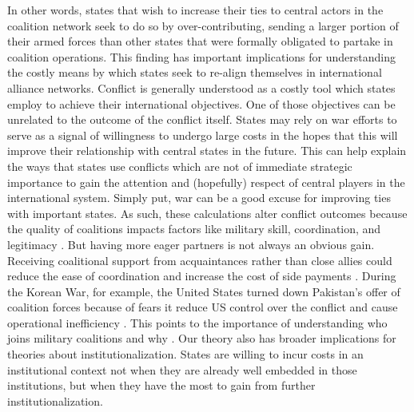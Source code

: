\documentclass[12pt,letterpaper]{article}
\begin{document}
	In other words, states that wish to increase their ties to central actors in the coalition network seek to do so by over-contributing, sending a larger portion of their armed forces than other states that were formally obligated to partake in coalition operations. This finding has important implications for understanding the costly means by which states seek to re-align themselves in international alliance networks. Conflict is generally understood as a costly tool which states employ to achieve their international objectives. One of those objectives can be unrelated to the outcome of the conflict itself. States may rely on war efforts to serve as a signal of willingness to undergo large costs in the hopes that this will improve their relationship with central states in the future. This can help explain the ways that states use conflicts which are not of immediate strategic importance to gain the attention and (hopefully) respect of central players in the international system. Simply put, war can be a good excuse for improving ties with important states. As such, these calculations alter conflict outcomes because the quality of coalitions impacts factors like military skill, coordination, and legitimacy \citep{auerswald_natoafghanistanfighting_2014, saideman_ambivalentcoalitiondoing_2016, cranmer_coalitionqualitymultinational_2017}. But having more eager partners is not always an obvious gain. Receiving coalitional support from acquaintances rather than close allies could reduce the ease of coordination and increase the cost of side payments \citep{papayoanou_intraalliancebargainingbosnia_1997, morrow_alliancesasymmetryalternative_1991, wolford_politicsmilitarycoalitions_2015}. During the Korean War, for example, the United States turned down Pakistan's offer of coalition forces because of fears it reduce US control over the conflict and cause operational inefficiency \citep{stueck_koreanwarinternational_1997}. This points to the importance of understanding who joins military coalitions and why \citep{wolford_politicsmilitarycoalitions_2015}. Our theory also has broader implications for theories about institutionalization. States are willing to incur costs in an institutional context not when they are already well embedded in those institutions, but when they have the most to gain from further institutionalization.
\end{document}
